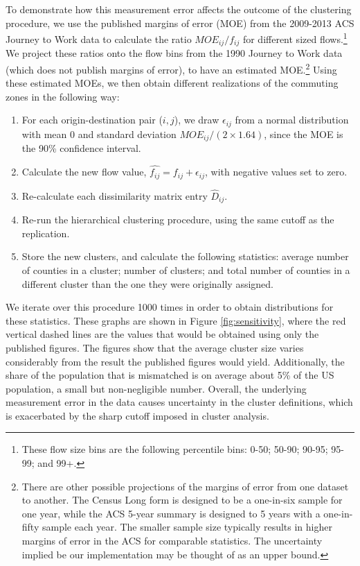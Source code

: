 To demonstrate how this measurement error affects the outcome of the clustering procedure, we use the published margins of error (MOE) from the 2009-2013 ACS Journey to Work data to calculate the ratio $MOE_{ij}/f_{ij}$ for different sized flows.\footnote{These flow size bins are the following percentile bins: 0-50; 50-90; 90-95; 95-99; and 99+.} We project these ratios onto the flow bins from the 1990 Journey to Work data (which does not publish margins of error), to have an estimated MOE.\footnote{There are other possible projections of the margins of error from one dataset to another. The Census Long form is designed to be a one-in-six sample for one year, while the ACS 5-year summary is designed to 5 years with a one-in-fifty sample each year. The smaller sample size typically results in higher margins of error in the ACS for comparable statistics. The uncertainty implied be our implementation may be thought of as an upper bound.} Using these estimated MOEs, we then obtain different realizations of the commuting zones in the following way:

\begin{enumerate}
	\item For each origin-destination pair ($i,j$), we draw $\epsilon_{ij}$ from a normal distribution with mean 0 and standard deviation $MOE_{ij}/(2 \times 1.64)$, since the MOE is the 90\% confidence interval.
	\item Calculate the new flow value, $\hat{f_{ij}} = f_{ij} + \epsilon_{ij}$, with negative values set to zero.
	\item Re-calculate each dissimilarity matrix entry $\hat{D}_{ij}$. 
	\item Re-run the hierarchical clustering procedure, using the same cutoff as the replication.
	\item Store the new clusters, and calculate the following statistics: average number of counties in a cluster; number of clusters; and total number of counties in a different cluster than the one they were originally assigned.
\end{enumerate}

We iterate over this procedure 1000 times in order to obtain distributions for these statistics. These graphs are shown in Figure \ref{fig:sensitivity}, where the red vertical dashed lines are the values that would be obtained using only the published figures. The figures show that the average cluster size varies considerably from the result the published figures would yield. Additionally, the share of the population that is mismatched is on average about 5\% of the US population, a small but non-negligible number. Overall, the underlying measurement error in the data causes uncertainty in the cluster definitions, which is exacerbated by the sharp cutoff imposed in cluster analysis.

